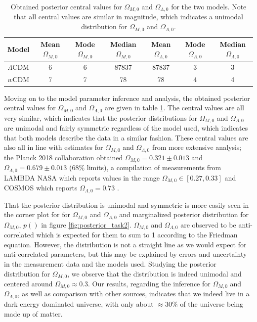 \documentclass[11pt,a4paper]{article}
\begin{document}
\begin{table}[H]
    \centering
    \caption{Obtained posterior central values for $\Omega_{M,0}$ and $\Omega_{\Lambda,0}$ for the two models. Note that all central values are similar in magnitude, which indicates a unimodal distribution for $\Omega_{M,0}$ and $\Omega_{\Lambda,0}$.}
    \begin{tabular}{||c c c c c c c||} 
         \hline
         Model & Mean $\Omega_{M,0}$ & Mode $\Omega_{M,0}$ & Median $\Omega_{M,0}$ & Mean $\Omega_{\Lambda,0}$ & Mode $\Omega_{\Lambda,0}$ & Median $\Omega_{\Lambda,0}$ \\ [0.5ex] 
         \hline\hline
         $\Lambda$CDM & 6 & 6 & 87837 & 87837 & 3 & 3 \\
         \hline
         $w$CDM & 7 & 7 & 78 & 78 & 4 & 4 \\ [1ex] 
         \hline 
    \end{tabular}
    \label{tab:central_values}
\end{table}

Moving on to the model parameter inference and analysis, the obtained posterior central values for $\Omega_{M,0}$ and $\Omega_{\Lambda,0}$ are given in table \ref{tab:central_values}. The central values are all very similar, which indicates that the posterior distributions for $\Omega_{M,0}$ and $\Omega_{\Lambda,0}$ are unimodal and fairly symmetric regardless of the model used, which indicates that both models describe the data in a similar fashion. These central values are also all in line with estimates for $\Omega_{M,0}$ and $\Omega_{\Lambda,0}$ from more extensive analysis; the Planck 2018 collaboration obtained $\Omega_{M,0} = 0.321 \pm 0.013$ and $\Omega_{\Lambda,0} = 0.679 \pm 0.013$ \cite{planck} (68\% limits), a compilation of measurements from LAMBDA NASA which reports values in the range $\Omega_{M,0}\in \left[0.27, 0.33 \right]$ \cite{lambdanasa} and COSMOS which reports $\Omega_{\Lambda,0} = 0.73$ \cite{cosmos}. 

That the posterior distribution is unimodal and symmetric is more easily seen in the corner plot for for $\Omega_{M,0}$ and $\Omega_{\Lambda,0}$ and marginalized posterior distribution for $\Omega_{M,0}$, $p()$ in figure \ref{fig:posterior_task2}. $\Omega_{M,0}$ and $\Omega_{\Lambda,0}$ are observed to be anti-correlated which is expected for them to sum to 1 according to the Friedman equation. However, the distribution is not a straight line as we would expect for anti-correlated parameters, but this may be explained by errors and uncertainty in the measurement data and the models used. Studying the posterior distribution for $\Omega_{M,0}$, we observe that the distribution is indeed unimodal and centered around $\Omega_{M,0}\approx0.3$. Our results, regarding the inference for $\Omega_{M,0}$ and $\Omega_{\Lambda,0}$, as well as comparison with other sources, indicates that we indeed live in a dark energy dominated universe, with only about $\approx 30\%$ of the universe being made up of matter.
\end{document}
